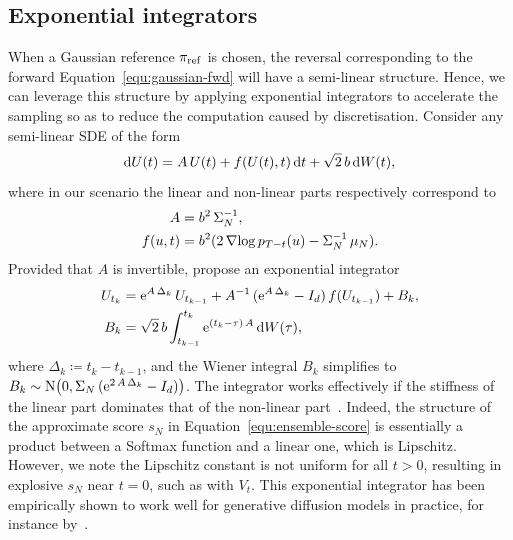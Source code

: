 \documentclass{article}
\begin{document}
\subsection{Exponential integrators}
\label{sec:exp-integrator}
When a Gaussian reference $\pi_{\mathrm{ref}}$ is chosen, the reversal corresponding to the forward Equation~\eqref{equ:gaussian-fwd} will have a semi-linear structure. 
Hence, we can leverage this structure by applying exponential integrators to accelerate the sampling so as to reduce the computation caused by discretisation. 
Consider any semi-linear SDE of the form
%
\begin{equation}
    \mathop{}\!\mathrm{d} U(t) = A \, U(t) + f(U(t), t) \mathop{}\!\mathrm{d} t + \sqrt{2} \, b \mathop{}\!\mathrm{d} W(t), 
\end{equation}
%
where in our scenario the linear and non-linear parts respectively correspond to
%
\begin{equation}
    \begin{split}
        A &= b^2 \, \Sigma_N^{-1}, \\
        f(u, t) &= b^2 (2\operatorname{\nabla\!}\log p_{T - t}(u) - \Sigma_N^{-1} \, \mu_N).
    \end{split}
\end{equation}
%
Provided that $A$ is invertible, \citet{Jentzen2009} propose an exponential integrator
%
\begin{equation*}
    \begin{split}
        U_{t_{k}} &= \mathrm{e}^{A \, \Delta_k} \, U_{t_{k-1}} + A^{-1} \, (\mathrm{e}^{A \, \Delta_k} - I_d) \, f(U_{t_{k-1}}) + B_k, \\
        B_k &= \sqrt{2} \, b \int^{t_{k}}_{t_{k-1}} \mathrm{e}^{(t_{k} - \tau) \, A} \mathop{}\!\mathrm{d} W(\tau),
    \end{split}
\end{equation*}
%
where $\Delta_k \coloneqq t_{k} - t_{k-1}$, and the Wiener integral $B_k$ simplifies to $B_k \sim \mathrm{N}\bigl(0, \Sigma_N \, (\mathrm{e}^{2 \, A \, \Delta_k} - I_d)\bigr)$. 
The integrator works effectively if the stiffness of the linear part dominates that of the non-linear part~\citep[see conditions in e.g.,][]{Buckwar2011}. 
Indeed, the structure of the approximate score $s_N$ in Equation~\eqref{equ:ensemble-score} is essentially a product between a Softmax function and a linear one, which is Lipschitz. 
However, we note the Lipschitz constant is not uniform for all $t>0$, resulting in explosive $s_N$ near $t=0$, such as with $V_t$. 
This exponential integrator has been empirically shown to work well for generative diffusion models in practice, for instance by~\citet{Lu2025expn}.
\end{document}
